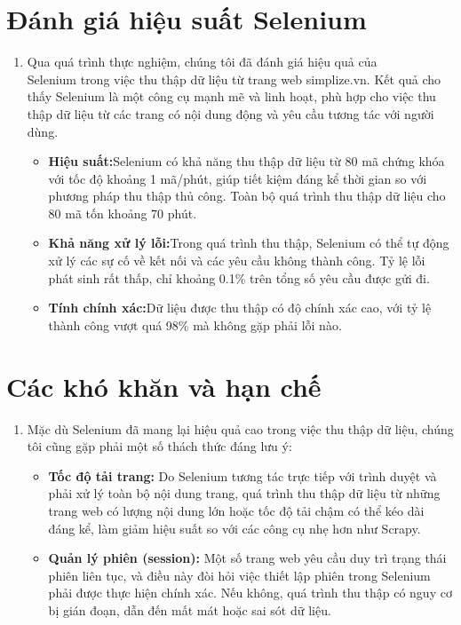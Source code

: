 \section{Đánh giá hiệu suất Selenium}
\begin{enumerate}
    \item []\hspace*{0.7cm}Qua quá trình thực nghiệm, chúng tôi đã đánh giá hiệu quả của\\Selenium trong việc thu thập dữ liệu từ trang web simplize.vn. Kết quả cho thấy Selenium là một công cụ mạnh mẽ và linh hoạt, phù hợp cho việc thu thập dữ liệu từ các trang có nội dung động và yêu cầu tương tác với người dùng.
    \begin{itemize}[left=0.5cm]
    \item [$\bullet$]\textbf{Hiệu suất:}Selenium có khả năng thu thập dữ liệu từ 80 mã chứng khóa với tốc độ khoảng 1 mã/phút, giúp tiết kiệm đáng kể thời gian so với phương pháp thu thập thủ công. Toàn bộ quá trình thu thập dữ liệu cho 80 mã tốn khoảng 70 phút.
    \item [$\bullet$]\textbf{Khả năng xử lý lỗi:}Trong quá trình thu thập, Selenium có thể tự động xử lý các sự cố về kết nối và các yêu cầu không thành công. Tỷ lệ lỗi phát sinh rất thấp, chỉ khoảng 0.1\% trên tổng số yêu cầu được gửi đi.
    \item [$\bullet$]\textbf{Tính chính xác:}Dữ liệu được thu thập có độ chính xác cao, với tỷ lệ thành công vượt quá 98\% mà không gặp phải lỗi nào.
    \end{itemize}
\end{enumerate}

\section{Các khó khăn và hạn chế}
\begin{enumerate}
    \item []\hspace*{0.7cm}Mặc dù Selenium đã mang lại hiệu quả cao trong việc thu thập dữ liệu, chúng tôi cũng gặp phải một số thách thức đáng lưu ý:
    
\begin{itemize}[left=0.5cm]
    \item [$\bullet$]\textbf{Tốc độ tải trang:} Do Selenium tương tác trực tiếp với trình duyệt và phải xử lý toàn bộ nội dung trang, quá trình thu thập dữ liệu từ những trang web có lượng nội dung lớn hoặc tốc độ tải chậm có thể kéo dài đáng kể, làm giảm hiệu suất so với các công cụ nhẹ hơn như Scrapy.
    
    \item [$\bullet$]\textbf{Quản lý phiên (session):} Một số trang web yêu cầu duy trì trạng thái phiên liên tục, và điều này đòi hỏi việc thiết lập phiên trong Selenium phải được thực hiện chính xác. Nếu không, quá trình thu thập có nguy cơ bị gián đoạn, dẫn đến mất mát hoặc sai sót dữ liệu.
\end{itemize}

\end{enumerate}
